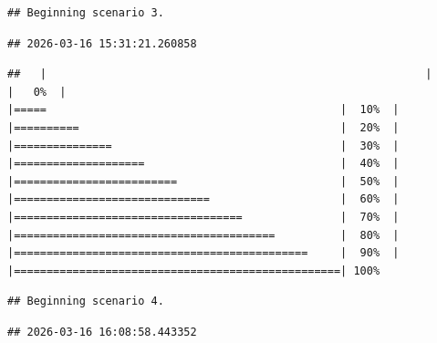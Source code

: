 \documentclass[
]{article}
\begin{document}
\begin{verbatim}
## Beginning scenario 3.
\end{verbatim}

\begin{verbatim}
## 2026-03-16 15:31:21.260858
\end{verbatim}

\begin{verbatim}
##   |                                                          |                                                  |   0%  |                                                          |=====                                             |  10%  |                                                          |==========                                        |  20%  |                                                          |===============                                   |  30%  |                                                          |====================                              |  40%  |                                                          |=========================                         |  50%  |                                                          |==============================                    |  60%  |                                                          |===================================               |  70%  |                                                          |========================================          |  80%  |                                                          |=============================================     |  90%  |                                                          |==================================================| 100%
\end{verbatim}

\begin{verbatim}
## Beginning scenario 4.
\end{verbatim}

\begin{verbatim}
## 2026-03-16 16:08:58.443352
\end{verbatim}
\end{document}
